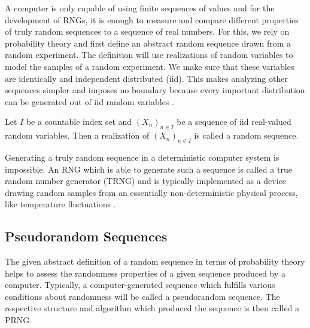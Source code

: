 \documentclass{stdlocal}
\begin{document}
  A computer is only capable of using finite sequences of values and for the development of RNGs, it is enough to measure and compare different properties of truly random sequences to a sequence of real numbers.
  For this, we rely on probability theory and first define an abstract random sequence drawn from a random experiment.
  The definition will use realizations of random variables to model the samples of a random experiment.
  We make sure that these variables are identically and independent distributed (iid).
  This makes analyzing other sequences simpler and imposes no boundary because every important distribution can be generated out of iid random variables \autocite[\ppno~81-111]{kneusel2018}.

  \begin{definition}
    Let $I$ be a countable index set and $(X_n)_{n\in I}$ be a sequence of iid real-valued random variables.
    Then a realization of $(X_n)_{n\in I}$ is called a random sequence.
  \end{definition}
  Generating a truly random sequence in a deterministic computer system is impossible.
  An RNG which is able to generate such a sequence is called a true random number generator (TRNG) and is typically implemented as a device drawing random samples from an essentially non-deterministic physical process, like temperature fluctuations \autocite{intel-drng}.

  \subsection{Pseudorandom Sequences}
  The given abstract definition of a random sequence in terms of probability theory helps to assess the randomness properties of a given sequence produced by a computer.
  Typically, a computer-generated sequence which fulfills various conditions about randomness will be called a pseudorandom sequence.
  The respective structure and algorithm which produced the sequence is then called a PRNG.
\end{document}
